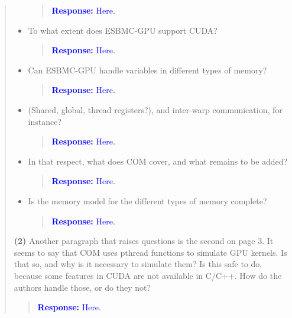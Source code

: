 \documentclass[11pt]{article}
\begin{document}
\begin{quote}
\begin{itemize}
  \begin{quote}
  \textcolor{blue}{\textbf{Response:} Here.}
  \end{quote}
  
  \item To what extent does ESBMC-GPU support CUDA?
  
  \begin{quote}
  \textcolor{blue}{\textbf{Response:} Here.}
  \end{quote}
  
  \item Can ESBMC-GPU handle variables in different types of memory?
  
  \begin{quote}
  \textcolor{blue}{\textbf{Response:} Here.}
  \end{quote}
  
  \item (Shared, global, thread registers?), and inter-warp communication, for instance?
  
  \begin{quote}
  \textcolor{blue}{\textbf{Response:} Here.}
  \end{quote}
  
  \item In that respect, what does COM cover, and what remains to be added?
  
  \begin{quote}
  \textcolor{blue}{\textbf{Response:} Here.}
  \end{quote}
  
  \item Is the memory model for the different types of memory complete?
  
  \begin{quote}
  \textcolor{blue}{\textbf{Response:} Here.}
  \end{quote}
  
  \end{itemize}

{\bf (2)} Another paragraph that raises questions is the second on page 3. It seems to say that COM uses pthread functions to simulate GPU kernels. Is that so, and why is it necessary to simulate them? Is this safe to do, because some features in CUDA are not available in C/C++. How do the authors handle those, or do they not?

\begin{quote}
\textcolor{blue}{\textbf{Response:} Here.}
\end{quote}


\end{quote}
\end{document}
